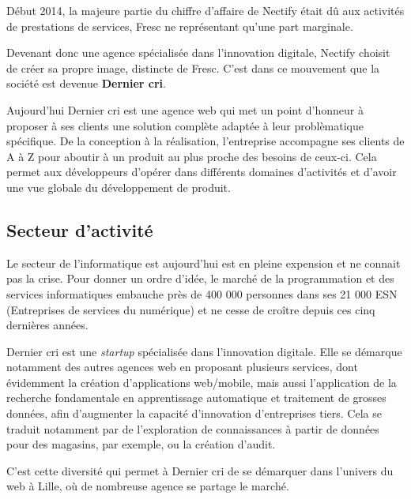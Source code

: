 \bigskip

Début 2014, la majeure partie du chiffre d'affaire de Nectify était dû
aux activités de prestations de services, Fresc ne représentant qu'une
part marginale.

\bigskip

Devenant donc une agence spécialisée dans l'innovation digitale, Nectify
choisit de créer sa propre image, distincte de Fresc. C'est dans ce
mouvement que la société est devenue \textbf{Dernier cri}.

\bigskip

Aujourd'hui Dernier cri est une agence web qui met un point d'honneur à
proposer à ses clients une solution complète adaptée à leur
problèmatique spécifique. De la conception à la réalisation,
l'entreprise accompagne ses clients de A à Z pour aboutir à un produit
au plus proche des besoins de ceux-ci. Cela permet aux développeurs
d'opérer dans différents domaines d'activités et d'avoir une vue globale
du développement de produit.

\bigskip

\subsection{Secteur d'activité}\label{secteur-dactivituxe9}

\bigskip

Le secteur de l'informatique est aujourd'hui est en pleine expension et
ne connait pas la crise. Pour donner un ordre d'idée, le marché de la
programmation et des services informatiques embauche près de 400 000
personnes dans ses 21 000 ESN (Entreprises de services du numérique) et
ne cesse de croître depuis ces cinq dernières années.

\bigskip

Dernier cri est une \emph{startup} spécialisée dans l'innovation
digitale. Elle se démarque notamment des autres agences web en proposant
plusieurs services, dont évidemment la création d'applications
web/mobile, mais aussi l'application de la recherche fondamentale en
apprentissage automatique et traitement de grosses données, afin
d'augmenter la capacité d'innovation d'entreprises tiers. Cela se
traduit notamment par de l'exploration de connaissances à partir de
données pour des magasins, par exemple, ou la création d'audit.

\bigskip

C'est cette diversité qui permet à Dernier cri de se démarquer dans
l'univers du web à Lille, où de nombreuse agence se partage le marché.

